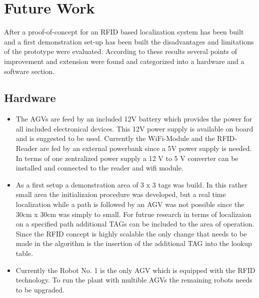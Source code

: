 
\section{Future Work}
After a proof-of-concept for an RFID based localization system has been built and a first demonstration set-up has been built the disadvantages and limitations of the prototype were evaluated. According to these results several points of improvement and extension were found and categorized into a hardware and a software section. 
\subsection{Hardware}
\begin{itemize}
\item The AGVs are feed by an included 12V battery which provides the power for all included electronical devices. This 12V power supply is available on board and is suggested to be used. Currently the WiFi-Module and the RFID-Reader are fed by an external powerbank since a 5V power supply is needed. In terms of one zentralized power supply a 12 V to 5 V converter can be installed and connected to the reader and wifi module.
\item As a first setup a demonstration area of 3 x 3 tags was build. In this rather small area the initializaion procedure was developed, but a real time localization while a path is followed by an AGV was not possible since the 30cm x 30cm was simply to small. For futrue research in terms of localizaion on a specified path additional TAGs can be included to the area of operation. Since the RFID concept is highly scalable the only change that needs to be made in the algorithm is the insertion of the additional TAG into the lookup table.
\item Currently the Robot No. 1 is the only AGV which is equipped with the RFID technology. To run the plant with multible AGVs the remaining robots needs to be upgraded.\\
\end{itemize}
